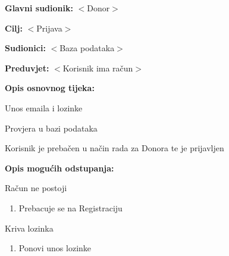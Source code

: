 					\noindent {}
					\begin{packed_item}
						
						\item \textbf{Glavni sudionik:} $<$Donor$>$
						\item \textbf{Cilj:} $<$Prijava$>$
						\item \textbf{Sudionici:} $<$Baza podataka$>$
						\item \textbf{Preduvjet:} $<$Korisnik ima račun$>$
						\item \textbf{Opis osnovnog tijeka:}
						
						\begin{packed_enum}
							
							\item Unos emaila i lozinke
							\item Provjera u bazi podataka
							\item Korisnik je prebačen u način rada za Donora te je prijavljen
							
						\end{packed_enum}
						
						\item \textbf{Opis mogućih odstupanja:}
						
						\begin{packed_item}
							
							\item[3.a] Račun ne postoji
							\begin{enumerate}
								\item Prebacuje se na Registraciju
							\end{enumerate}
							\item[3.b] Kriva lozinka
							\begin{enumerate}
								\item Ponovi unos lozinke
							\end{enumerate}
							
						\end{packed_item}
						
					\end{packed_item}
					
